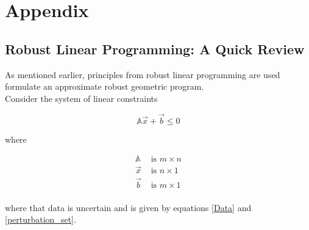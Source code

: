 \section*{Appendix}

\subsection{Robust Linear Programming: A Quick Review} \label{LP_to_GP}

As mentioned earlier, principles from robust linear programming are used
formulate an approximate robust geometric program.\\[12pt]
Consider the system of linear constraints

\begin{equation*}
    \mathbb{A}\vec{x} + \vec{b} \leq 0
\end{equation*}

where

\begin{equation*}
\begin{aligned}
\mathbb{A} &\text{ is $m \times n$}\\
\vec{x} &\text{ is $n \times 1$}\\
\vec{b} &\text{ is $m \times 1$}\\
\end{aligned}
\end{equation*}

where that data is uncertain and is given by equations \eqref{Data} and \eqref{perturbation_set}.

